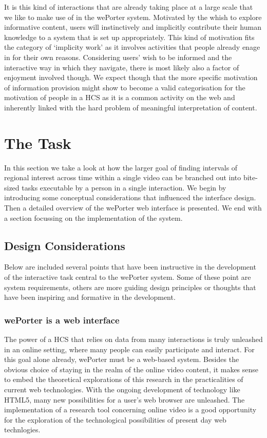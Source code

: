It is this kind of interactions that are already taking place at a large scale that we like to make use of in the wePorter system. Motivated by the whish to explore informative content, users will instinctively and implicitly contribute their human knowledge to a system that is set up appropriately. This kind of motivation fits the category of `implicity work' as it involves activities that people already enage in for their own reasons\cite{Quinn:2011us}. Considering users' wish to be informed and the interactive way in which they navigate, there is most likely also a factor of enjoyment involved though. We expect though that the more specific motivation of information provision might show to become a valid categorisation for the motivation of people in a HCS as it is a common activity on the web and inherently linked with the hard problem of meaningful interpretation of content.

\section{The Task}

In this section we take a look at how the larger goal of finding intervals of regional interest across time within a single video can be branched out into bite-sized tasks executable by a person in a single interaction. We begin by introducing some conceptual considerations that influenced the interface design. Then a detailed overview of the wePorter web interface is presented. We end with a  section focussing on the implementation of the system.

\subsection{Design Considerations}
Below are included several points that have been instructive in the development of the interactive task central to the wePorter system. Some of these point are system requirements, others are more guiding design principles or thoughts that have been inspiring and formative in the development.

\subsubsection{wePorter is a web interface}
The power of a HCS that relies on data from many interactions is truly unleashed in an online setting, where many people can easily participate and interact. For this goal alone already, wePorter must be a web-based system.
Besides the obvious choice of staying in the realm of the online video content, it makes sense to embed the theoretical explorations of this research in the practicalities of current web technologies. With the ongoing development of technology like HTML5, many new possibilities for a user's web browser are unleashed. The implementation of a research tool concerning online video is a good opportunity for the exploration of the technological possibilities of present day web technlogies.


